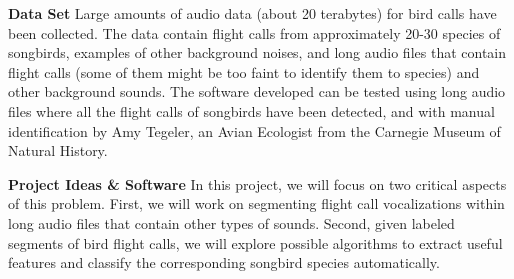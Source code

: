 \documentclass{article} %
\begin{document}

{\bf Data Set} Large amounts of audio data (about 20 terabytes) for bird calls have been collected. The data contain flight calls from approximately 20-30 species of songbirds, examples of other background noises, and long audio files that contain flight calls (some of them might be too faint to identify them to species) and other background sounds. The software developed can be tested using long audio files where all the flight calls of songbirds have been detected, and with manual identification by Amy Tegeler, an Avian Ecologist from the Carnegie Museum of Natural History.


{\bf Project Ideas \& Software} In this project, we will focus on two critical aspects of this problem. First, we will work on segmenting flight call vocalizations within long audio files that contain other types of sounds. Second, given labeled segments of bird flight calls, we will explore possible algorithms to extract useful features and classify the corresponding songbird species automatically.

\end{document}
